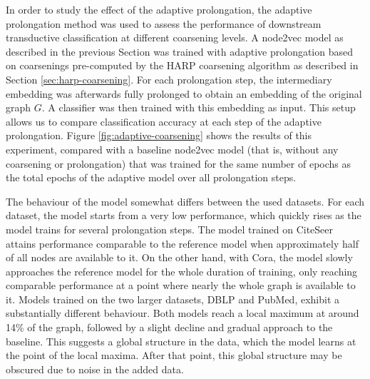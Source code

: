 In order to study the effect of the adaptive prolongation, the adaptive prolongation method was used to assess the performance of downstream transductive classification at different coarsening levels. A node2vec model as described in the previous Section was trained with adaptive prolongation based on coarsenings pre-computed by the HARP coarsening algorithm as described in Section \ref{sec:harp-coarsening}. For each prolongation step, the intermediary embedding was afterwards fully prolonged to obtain an embedding of the original graph \( G \). A classifier was then trained with this embedding as input. This setup allows us to compare classification accuracy at each step of the adaptive prolongation. Figure \ref{fig:adaptive-coarsening} shows the results of this experiment, compared with a baseline node2vec model (that is, without any coarsening or prolongation) that was trained for the same number of epochs as the total epochs of the adaptive model over all prolongation steps.

The behaviour of the model somewhat differs between the used datasets. For each dataset, the model starts from a very low performance, which quickly rises as the model trains for several prolongation steps. The model trained on CiteSeer attains performance comparable to the reference model when approximately half of all nodes are available to it. On the other hand, with Cora, the model slowly approaches the reference model for the whole duration of training, only reaching comparable performance at a point where nearly the whole graph is available to it. Models trained on the two larger datasets, DBLP and PubMed, exhibit a substantially different behaviour. Both models reach a local maximum at around 14\% of the graph, followed by a slight decline and gradual approach to the baseline. This suggests a global structure in the data, which the model learns at the point of the local maxima. After that point, this global structure may be obscured due to noise in the added data.


